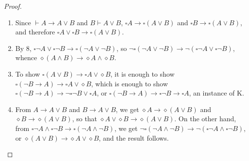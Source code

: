 \documentclass[12pt]{article}
\begin{document}
\begin{proof}
\begin{enumerate}
\item
Since $\vdash A\to A\lor B$ and $B\vdash A\lor B$, $\square A \to \square (A\lor B)$ and $\square B \to \square (A \lor B)$, and therefore $\square A \lor \square B \to \square (A \lor B)$.
\item
By 8, $\square \neg A \lor \square \neg B \to \square (\neg A \lor \neg B)$, so $\neg \square (\neg A \lor \neg B) \to \neg (\square \neg A \lor \square \neg B)$, whence $\diamond (A\land B) \to \diamond A \land \diamond B$.
\item
To show $\square (A\lor B)\to \square A \lor \diamond B$, it is enough to show $\square (\neg B\to A) \to \square A \lor \diamond B$, which is enough to show $\square (\neg B\to A)\to \neg \square \neg B \lor \square A$, or $\square (\neg B\to A)\to \square \neg B\to \square A$, an instance of K.
\item
From $A\to A\lor B$ and $B\to A\lor B$, we get $\diamond A \to \diamond (A\lor B)$ and $\diamond B \to \diamond (A\lor B)$, so that $\diamond A \lor \diamond B\to \diamond (A\lor B)$.  On the other hand, from $\square \neg A \land \square \neg B \to \square (\neg A\land \neg B)$, we get $\neg \square (\neg A \land \neg B)\to \neg (\square \neg A \land \square \neg B)$, or $\diamond (A \lor B)\to \diamond A \lor \diamond B$, and the result follows.
\end{enumerate}
\end{proof}
\end{document}
